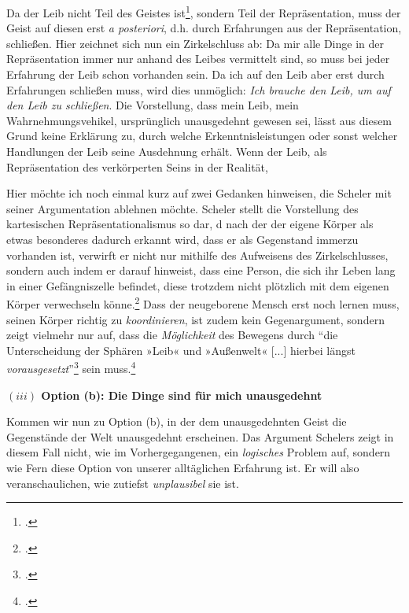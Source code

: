 \documentclass[a4paper, 12pt]{article}
\begin{document}
\begin{onehalfspace}

Da der Leib nicht Teil des Geistes ist\footnote{\Cite[Vgl.][S. 499]{scheler-ethik}.}, sondern Teil der Repräsentation, muss der Geist auf diesen erst \emph{a posteriori}, d.h. durch Erfahrungen aus der Repräsentation, schließen. Hier zeichnet sich nun ein Zirkelschluss ab: Da mir alle Dinge in der Repräsentation immer nur anhand des Leibes vermittelt sind, so muss bei jeder Erfahrung der Leib schon vorhanden sein. Da ich auf den Leib aber erst durch Erfahrungen schließen muss, wird dies unmöglich: \emph{Ich brauche den Leib, um auf den Leib zu schließen}. Die Vorstellung, dass mein Leib, mein Wahrnehmungsvehikel, ursprünglich unausgedehnt gewesen sei, lässt aus diesem Grund keine Erklärung zu, durch welche Erkenntnisleistungen oder sonst welcher Handlungen der Leib seine Ausdehnung erhält. Wenn der Leib, als Repräsentation des verkörperten Seins in der Realität, 

Hier möchte ich noch einmal kurz auf zwei Gedanken hinweisen, die Scheler mit seiner Argumentation ablehnen möchte. Scheler stellt die Vorstellung des kartesischen Repräsentationalismus so dar, d nach der der eigene Körper als etwas besonderes dadurch erkannt wird, dass er als Gegenstand immerzu vorhanden ist, verwirft er nicht nur mithilfe des Aufweisens des Zirkelschlusses, sondern auch indem er darauf hinweist, dass eine Person, die sich ihr Leben lang in einer Gefängniszelle befindet, diese trotzdem nicht plötzlich mit dem eigenen Körper verwechseln könne.\footnote{\Cite[Vgl.][S. 494]{scheler-ethik}.} Dass der neugeborene Mensch erst noch lernen muss, seinen Körper richtig zu \emph{koordinieren}, ist zudem kein Gegenargument, sondern zeigt vielmehr nur auf, dass die \emph{Möglichkeit} des Bewegens durch "`die Unterscheidung der Sphären »Leib« und »Außenwelt« [...] hierbei längst \emph{vorausgesetzt}"'\footnote{\Cite[Siehe][S. 496]{scheler-ethik}.} sein muss.\footnote{\Cite[Vgl. zudem auch][S. 492]{scheler-ethik}.} 


\vspace{5mm}
\noindent\textbf{$(iii)$ Option (b): Die Dinge sind für mich unausgedehnt}


\noindent Kommen wir nun zu Option (b), in der dem unausgedehnten Geist die Gegenstände der Welt unausgedehnt erscheinen. Das Argument Schelers zeigt in diesem Fall nicht, wie im Vorhergegangenen, ein \emph{logisches} Problem auf, sondern wie Fern diese Option von unserer alltäglichen Erfahrung ist. Er will also veranschaulichen, wie zutiefst \emph{unplausibel} sie ist.


\end{onehalfspace}
\end{document}
